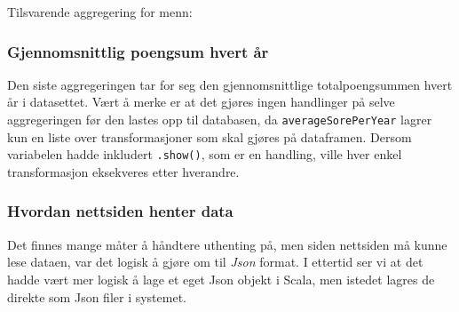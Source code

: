 
Tilsvarende aggregering for menn:


\subsubsection{Gjennomsnittlig poengsum hvert år}
Den siste aggregeringen tar for seg den gjennomsnittlige totalpoengsummen hvert år i datasettet. Vært å merke er at det gjøres ingen handlinger på selve aggregeringen før den lastes opp til databasen, da \lstinline{averageSorePerYear} lagrer kun en liste over transformasjoner som skal gjøres på dataframen. Dersom variabelen hadde inkludert \lstinline{.show()}, som er en handling, ville hver enkel transformasjon eksekveres etter hverandre.


\subsubsection{Hvordan nettsiden henter data}
Det finnes mange måter å håndtere uthenting på, men siden nettsiden må kunne lese dataen, var det logisk å gjøre om til \textit{Json} format. I ettertid ser vi at det hadde vært mer logisk å lage et eget Json objekt i Scala, men istedet lagres de direkte som Json filer i systemet.

